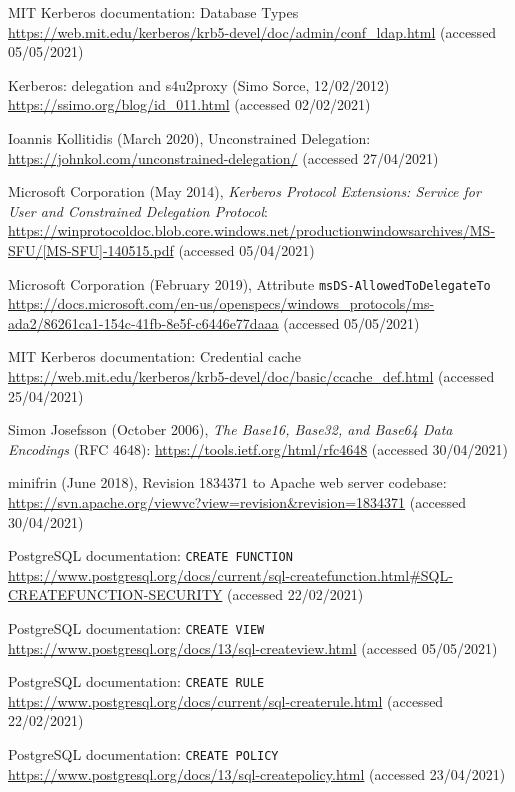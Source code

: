 \documentclass[12pt]{report}
\begin{document}
\begin{thebibliography}{99}
 MIT Kerberos documentation: Database Types \url{https://web.mit.edu/kerberos/krb5-devel/doc/admin/conf_ldap.html} (accessed 05/05/2021)

 Kerberos: delegation and s4u2proxy (Simo Sorce, 12/02/2012) \url{https://ssimo.org/blog/id_011.html} (accessed 02/02/2021)

 Ioannis Kollitidis (March 2020), Unconstrained Delegation: \url{https://johnkol.com/unconstrained-delegation/} (accessed 27/04/2021)

 Microsoft Corporation (May 2014), \textit{Kerberos Protocol Extensions: Service for User and Constrained Delegation Protocol}: \url{https://winprotocoldoc.blob.core.windows.net/productionwindowsarchives/MS-SFU/[MS-SFU]-140515.pdf} (accessed 05/04/2021)

 Microsoft Corporation (February 2019), Attribute \texttt{msDS-AllowedToDelegateTo} \url{https://docs.microsoft.com/en-us/openspecs/windows_protocols/ms-ada2/86261ca1-154c-41fb-8e5f-c6446e77daaa} (accessed 05/05/2021)

 MIT Kerberos documentation: Credential cache \url{https://web.mit.edu/kerberos/krb5-devel/doc/basic/ccache_def.html} (accessed 25/04/2021)

 Simon Josefsson (October 2006), \textit{The Base16, Base32, and Base64 Data Encodings} (RFC 4648): \url{https://tools.ietf.org/html/rfc4648} (accessed 30/04/2021)

 minifrin (June 2018), Revision 1834371 to Apache web server codebase: \url{https://svn.apache.org/viewvc?view=revision&revision=1834371} (accessed 30/04/2021)

 PostgreSQL documentation: \texttt{CREATE FUNCTION} \url{https://www.postgresql.org/docs/current/sql-createfunction.html#SQL-CREATEFUNCTION-SECURITY} (accessed 22/02/2021)

 PostgreSQL documentation: \texttt{CREATE VIEW} \url{https://www.postgresql.org/docs/13/sql-createview.html} (accessed 05/05/2021)

 PostgreSQL documentation: \texttt{CREATE RULE} \url{https://www.postgresql.org/docs/current/sql-createrule.html} (accessed 22/02/2021)

 PostgreSQL documentation: \texttt{CREATE POLICY} \url{https://www.postgresql.org/docs/13/sql-createpolicy.html} (accessed 23/04/2021)


\end{thebibliography}
\end{document}
